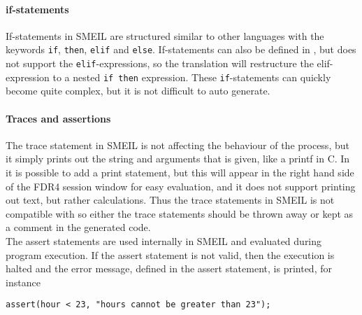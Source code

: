 \paragraph{if-statements}
If-statements in SMEIL are structured similar to other languages with the keywords \texttt{if}, \texttt{then}, \texttt{elif} and \texttt{else}.
If-statements can also be defined in \cspm, but \cspm does not support the \texttt{elif}-expressions, so the translation will restructure the elif-expression to a nested \texttt{if then} expression. These \texttt{if}-statements can quickly become quite complex, but it is not difficult to auto generate.\\


\paragraph{Traces and assertions}
The trace statement in SMEIL is not affecting the behaviour of the process, but it simply prints out the string and arguments that is given, like a printf in C.
In \cspm it is possible to add a print statement, but this will appear in the right hand side of the FDR4 session window for easy evaluation, and it does not support printing out text, but rather calculations. Thus the trace statements in SMEIL is not compatible with \cspm so either the trace statements should be thrown away or kept as a comment in the generated code.\\

The assert statements are used internally in SMEIL and evaluated during program execution. If the assert statement is not valid, then the execution is halted and the error message, defined in the assert statement, is printed, for instance
\begin{verbatim}
assert(hour < 23, "hours cannot be greater than 23");
\end{verbatim}

